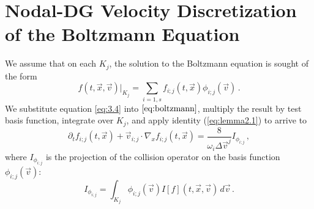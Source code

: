 \documentclass[12pt]{CSUNthesis}
\begin{document}
\section{Nodal-DG Velocity Discretization of the Boltzmann Equation}
We assume that on each $K_j$, the solution to the Boltzmann equation is sought of the form 
\begin{equation}
\label{eq:3.4}
f(t,\vec{x},\vec{v})|_{K_{j}} = \sum_{i=1,s} f_{i;j}(t,\vec{x})\phi_{i;j}(\vec{v})\, .
\end{equation}
We substitute equation \ref{eq:3.4} into $\ref{eq:boltzmann}$, multiply the result by test basis function, integrate over $K_j$, and apply identity (\ref{eq:lemma2.1}) to arrive to
\begin{equation}
\label{discveloblzm}
\partial_{t} f_{i;j}(t,\vec{x}) + \vec{v}_{i;j}\cdot \nabla_{x} f_{i;j}(t,\vec{x}) =
\frac{8}{\omega_{i}\Delta\vec{v}^{j}}I_{\phi_{i;j}}\, ,
\end{equation}
where $I_{\phi_{i;j}}$ is the projection of the collision operator 
on the basis function $\phi_{i;j}(\vec{v})$:
\begin{equation}
\label{eq:projcoll}
I_{\phi_{i;j}} = \int_{K_{j}}\phi_{i;j}(\vec{v}) I[f](t,\vec{x},\vec{v})\, d\vec{v}\, .
\end{equation} 
\end{document}
